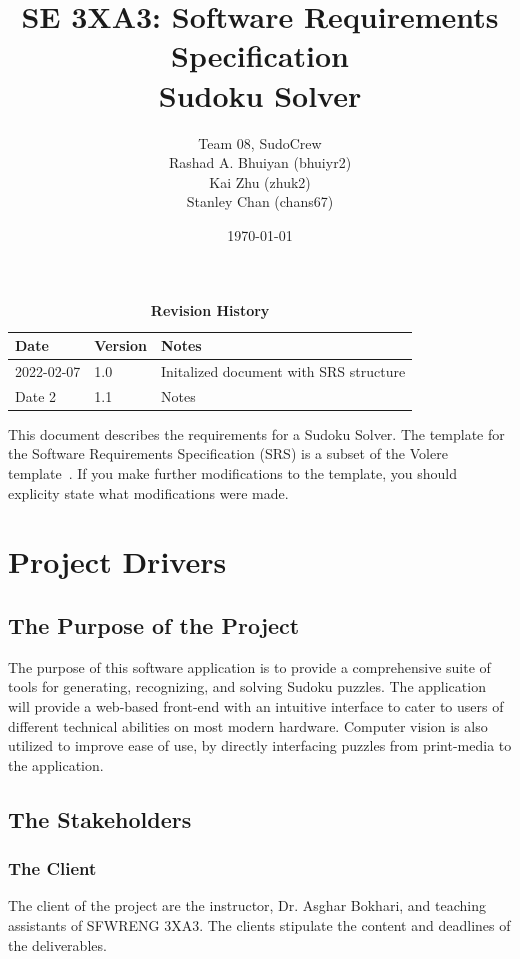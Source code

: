 \documentclass[11pt]{article}
\title{SE 3XA3: Software Requirements Specification\\Sudoku Solver}
\author{Team 08, SudoCrew
		\\ Rashad A. Bhuiyan (bhuiyr2)
		\\ Kai Zhu (zhuk2)
		\\ Stanley Chan (chans67)
}
\date{\today}
\begin{document}
\maketitle

\tableofcontents
\listoftables
\listoffigures

\begin{table}[bp]
\caption{\bf Revision History}
\begin{tabularx}{\textwidth}{p{3cm}p{2cm}X}
\toprule {\bf Date} & {\bf Version} & {\bf Notes}\\
\midrule
2022-02-07 & 1.0 & Initalized document with SRS structure\\
Date 2 & 1.1 & Notes\\
\bottomrule
\end{tabularx}
\end{table}

\newpage


This document describes the requirements for a Sudoku Solver.  The template for the Software
Requirements Specification (SRS) is a subset of the Volere
template~\citep{RobertsonAndRobertson2012}.  If you make further modifications
to the template, you should explicity state what modifications were made.

\section{Project Drivers}

\subsection{The Purpose of the Project}
The purpose of this software application is to provide a comprehensive suite of tools for generating, recognizing, and solving Sudoku puzzles. The application will provide a web-based front-end with an intuitive interface to cater to users of different technical abilities on most modern hardware. Computer vision is also utilized to improve ease of use, by directly interfacing puzzles from print-media to the application.

\subsection{The Stakeholders}
\subsubsection{The Client}
The client of the project are the instructor, Dr. Asghar Bokhari, and teaching assistants of SFWRENG 3XA3. The clients stipulate the content and deadlines of the deliverables.
\end{document}
